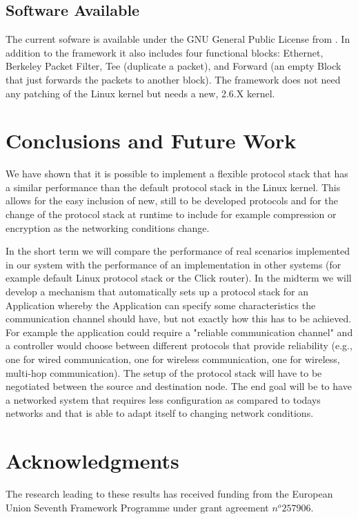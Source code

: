 \documentclass{sig-alternate}
\begin{document}
\subsection{Software Available}
The current sofware is available under the GNU General Public License from \cite{lana}. In addition to the framework it also includes four functional blocks: Ethernet, Berkeley Packet Filter, Tee (duplicate a packet), and Forward (an empty Block that just forwards the packets to another block). The framework does not need any patching of the Linux kernel but needs a new, 2.6.X kernel.

\section{Conclusions and Future Work}
We have shown that it is possible to implement a flexible protocol stack that has a similar performance than the default protocol stack in the Linux kernel. This allows for the easy inclusion of new, still to be developed protocols and for the change of the protocol stack at runtime to include for example compression or encryption as the networking conditions change. 

In the short term we will compare the performance of real scenarios implemented in our system with the performance of an implementation in other systems (for example default Linux protocol stack or the Click router). In the midterm we will develop a mechanism that automatically sets up a protocol stack for an Application whereby the Application can specify some characteristics the communication channel should have, but not exactly how this has to be achieved. For example the application could require a "reliable communication channel" and a controller would choose between different protocols that provide reliability (e.g., one for wired communication, one for wireless communication, one for wireless, multi-hop communication). The setup of the protocol stack will have to be negotiated between the source and destination node. The end goal will be to have a networked system that requires less configuration as compared to todays networks and that is able to adapt itself to changing network conditions.   



\section{Acknowledgments}
The research leading to these results has received funding from the European Union Seventh Framework Programme under grant agreement $n^o 257906$.
%

%
%
\end{document}
